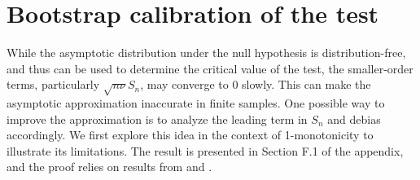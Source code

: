 \documentclass[12pt,letterpaper, twoside, openany]{article}
\theoremstyle{plain}
\begin{document}
\section{Bootstrap calibration of the test}\label{sect:bootstrap}
While the asymptotic distribution under the null hypothesis is distribution-free, and thus can be used to determine the critical value of the test, the smaller-order terms, particularly $\sqrt{n\nu} S_n$,  may converge to $0$ slowly. This can make the asymptotic approximation inaccurate in finite samples. One possible way to improve the approximation is to analyze the leading term in $S_n$ and debias accordingly. We first explore this idea in the context of 1-monotonicity to illustrate its limitations. The result is presented in Section F.1 of the appendix, and the proof relies on results from \cite{Kulikov2005} and \cite{Kulikov2008}.





\end{document}
